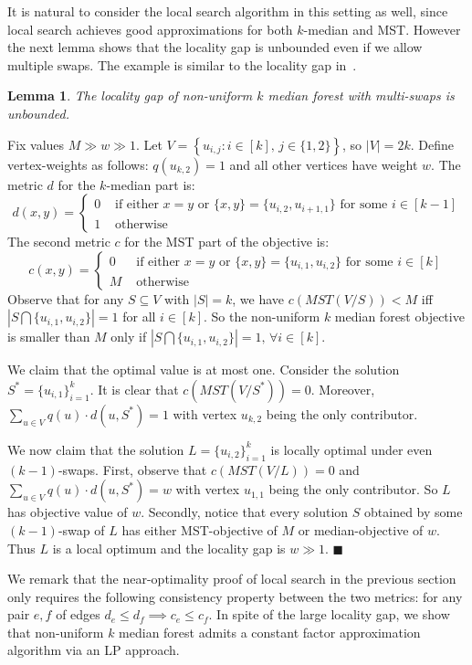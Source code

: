\documentclass[11pt,twoside,a4paper]{article}
\newtheorem{lemma}[theorem]{Lemma}
\newenvironment{proof}{

\noindent{\bf Proof:}} {\hfill$\blacksquare$


}
\newcommand{\sse}{\subseteq}
\def\kmf{$k$ median forest\xspace}
\begin{document}
It is natural to consider the local search algorithm in this setting as well, since local search achieves good
approximations for both $k$-median and MST. However the next lemma shows that the locality gap is unbounded even if we
allow multiple swaps. The example is similar to the locality gap in~\cite{KKNSS11}.
\begin{lemma}
The locality gap of non-uniform \kmf with multi-swaps is unbounded.
\end{lemma}
\begin{proof}
Fix values $M\gg w\gg 1$. Let $V=\left\{ u_{i,j} : i\in[k],\, j\in\{1,2\}\right\}$, so $|V|=2k$. Define vertex-weights
as follows: $q(u_{k,2})=1$ and all other vertices have weight $w$. The metric $d$ for the $k$-median part is:
$$
d(x,y) = \left\{
\begin{array}{ll}
0 & \mbox{ if either }x=y \mbox{ or }\{x,y\} = \{u_{i,2},u_{i+1,1}\} \mbox{ for some }i\in [k-1]\\
1 & \mbox{ otherwise} \end{array}\right.
$$
The second metric $c$ for the MST part of the objective is:
$$
c(x,y) = \left\{
\begin{array}{ll}
0 & \mbox{ if either }x=y \mbox{ or }\{x,y\} = \{u_{i,1},u_{i,2}\} \mbox{ for some }i\in [k]\\
M & \mbox{ otherwise} \end{array}\right.
$$
Observe that for any $S\sse V$ with $|S|=k$, we have $c(MST(V/S))<M$ iff $|S\bigcap \{u_{i,1}, u_{i,2}\}|=1$ for all
$i\in[k]$. So the non-uniform \kmf objective is smaller than $M$ only if $|S\bigcap \{u_{i,1}, u_{i,2}\}|=1,\, \forall
i\in[k]$.

We claim that the optimal value is at most one. Consider the solution $S^*=\{u_{i,1}\}_{i=1}^k$. It is clear that
$c(MST(V/S^*))=0$. Moreover, $\sum_{u\in V} q(u)\cdot d(u,S^*) = 1$ with vertex $u_{k,2}$ being the only contributor.

We now claim that the solution $L=\{u_{i,2}\}_{i=1}^k$ is locally optimal under even $(k-1)$-swaps. First, observe that
$c(MST(V/L))=0$ and $\sum_{u\in V} q(u)\cdot d(u,S^*) = w$ with vertex $u_{1,1}$ being the only contributor. So $L$ has
objective value of $w$. Secondly, notice that every solution $S$ obtained by some $(k-1)$-swap of $L$ has either
MST-objective of $M$ or median-objective of $w$. Thus $L$ is a local optimum and the locality gap is $w\gg 1$.
\end{proof}

\medskip

We remark that the near-optimality proof of local search in the previous section only requires the following
consistency property between the two metrics: for any pair $e,f$ of edges $d_e\le d_f \implies c_e\le c_f$. In spite of
the large locality gap, we show that non-uniform \kmf admits a constant factor approximation algorithm via an LP
approach.
\end{document}
